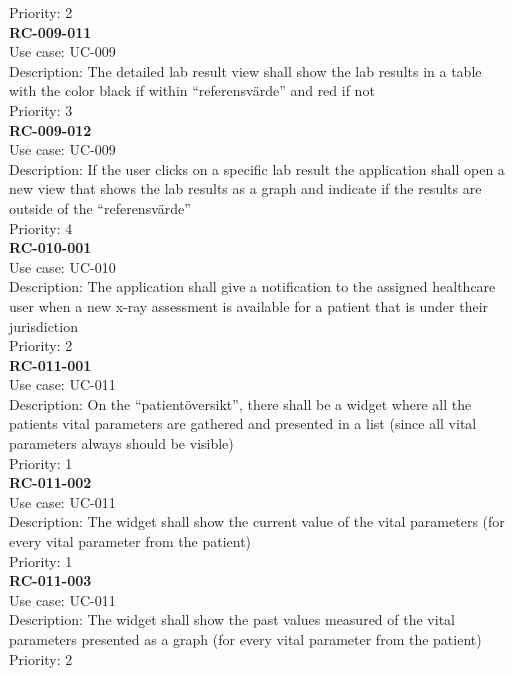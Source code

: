 Priority: 2 \\
\newline
\textbf{RC-009-011} \\
Use case: UC-009 \\
Description: The detailed lab result view shall show the lab results in a table with the color black if within “referensvärde” and red if not \\
Priority: 3 \\
\newline
\textbf{RC-009-012} \\
Use case: UC-009 \\
Description: If the user clicks on a specific lab result the application shall open a new view that shows the lab results as a graph and indicate if the results are outside of the “referensvärde” \\
Priority: 4 \\
\newline
\textbf{RC-010-001} \\
Use case: UC-010 \\
Description: The application shall give a notification to the assigned healthcare user when a new x-ray assessment is available for a patient that is under their jurisdiction \\
Priority: 2 \\
\newline
\textbf{RC-011-001} \\
Use case: UC-011 \\
Description: On the “patientöversikt”, there shall be a widget where all the patients vital parameters are gathered and presented in a list (since all vital parameters always should be visible) \\
Priority: 1 \\
\newline
\textbf{RC-011-002} \\
Use case: UC-011 \\
Description: The widget shall show the current value of the vital parameters (for every vital parameter from the patient) \\
Priority: 1 \\
\newline
\textbf{RC-011-003} \\
Use case: UC-011 \\
Description: The widget shall show the past values measured of the vital parameters presented as a graph (for every vital parameter from the patient) \\
Priority: 2 \\
